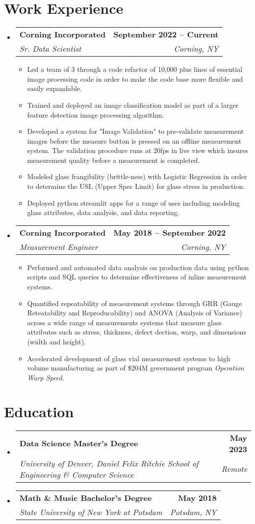 \documentclass[letterpaper,11pt]{article}
\makeatletter
\newcommand{\resumeItem}[1]{
  \item\small{
    {#1 \vspace{-2pt}}
  }
}
\newcommand{\resumeSubheading}[4]{
  \vspace{-2pt}\item
    \begin{tabular*}{1.0\textwidth}[t]{l@{\extracolsep{\fill}}r}
      \textbf{#1} & \textbf{\small #2} \\
      \textit{\small#3} & \textit{\small #4} \\
    \end{tabular*}\vspace{-7pt}
}
\newcommand{\resumeSubHeadingListStart}{\begin{itemize}[leftmargin=0.0in, label={}]}
\newcommand{\resumeSubHeadingListEnd}{\end{itemize}}
\newcommand{\resumeItemListStart}{\begin{itemize}}
\newcommand{\resumeItemListEnd}{\end{itemize}\vspace{-5pt}}
\makeatother
\begin{document}
\section{Work Experience}
  \resumeSubHeadingListStart

    \resumeSubheading
      {Corning Incorporated}{September 2022 -- Current}
      {Sr. Data Scientist}{Corning, NY}
      \resumeItemListStart
        \resumeItem{Led a team of 3 through a code refactor of 10,000 plus lines of essential image processing code in order to make the code base more flexible and easily expandable.}
        \resumeItem{Trained and deployed an image classification model as part of a larger feature detection image processing algorithm.}
        \resumeItem{Developed a system for "Image Validation" to pre-validate measurement images before the measure button is pressed on an offline measurement system. The validation procedure runs at 20fps in live view which insures measurement quality before a measurement is completed.}
        \resumeItem{Modeled glass frangibility (brittle-ness) with Logistic Regression in order to determine the USL (Upper Spec Limit) for glass stress in production.}
        \resumeItem{Deployed python streamlit apps for a range of uses including modeling glass attributes, data analysis, and data reporting.}
      \resumeItemListEnd

    \resumeSubheading
      {Corning Incorporated}{May 2018 -- September 2022}
      {Measurement Engineer}{Corning, NY}
      \resumeItemListStart
        \resumeItem{Performed and automated data analysis on production data using python scripts and SQL queries to determine effectiveness of inline measurement systems.}
        \resumeItem{Quantified repeatability of measurement systems through GRR (Gauge Reteatability and Reproducability) and ANOVA (Analysis of Variance) across a wide range of measurements systems that measure glass attributes such as stress, thickness, defect dection, warp, and dimensions (width and height).}
        \resumeItem{Accelerated development of glass vial measurement systems to high volume manufacturing as part of \$204M
        government program \textit{Operation Warp Speed}.}
    \resumeItemListEnd
    
  \resumeSubHeadingListEnd
\vspace{-16pt}

\section{Education}
\resumeSubHeadingListStart
  \resumeSubheading
    {Data Science Master's Degree}{May 2023}
    {University of Denver, Daniel Felix Ritchie School of Engineering \& Computer Science}{Remote}
  \resumeSubheading
    {Math \& Music Bachelor's Degree}{May 2018}
    {State University of New York at Potsdam}{Potsdam, NY}
\resumeSubHeadingListEnd
\end{document}
